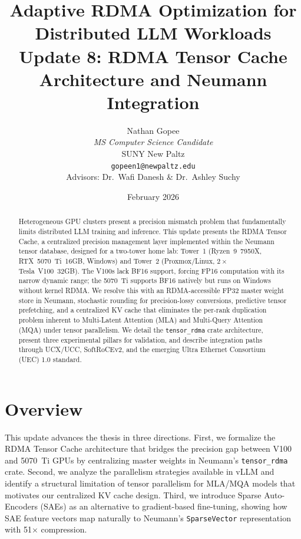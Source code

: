 \documentclass[11pt,letterpaper]{article}
\title{
    \vspace{-1cm}
    \textbf{Adaptive RDMA Optimization for Distributed LLM Workloads} \\[0.5em]
    \large Update 8: RDMA Tensor Cache Architecture and Neumann Integration
}
\author{
    Nathan Gopee \\
    \textit{MS Computer Science Candidate} \\
    SUNY New Paltz \\
    \texttt{gopeen1@newpaltz.edu} \\[1em]
    \small Advisors: Dr.\ Wafi Danesh \& Dr.\ Ashley Suchy
}
\date{February 2026}
\theoremstyle{definition}
\begin{document}
\maketitle

\begin{abstract}
\noindent
Heterogeneous GPU clusters present a precision mismatch problem that fundamentally limits distributed LLM training and inference. This update presents the RDMA Tensor Cache, a centralized precision management layer implemented within the Neumann tensor database, designed for a two-tower home lab: Tower~1 (Ryzen~9~7950X, RTX~5070~Ti~16GB, Windows) and Tower~2 (Proxmox/Linux, $2\times$ Tesla~V100~32GB). The V100s lack BF16 support, forcing FP16 computation with its narrow dynamic range; the 5070~Ti supports BF16 natively but runs on Windows without kernel RDMA. We resolve this with an RDMA-accessible FP32 master weight store in Neumann, stochastic rounding for precision-lossy conversions, predictive tensor prefetching, and a centralized KV cache that eliminates the per-rank duplication problem inherent to Multi-Latent Attention (MLA) and Multi-Query Attention (MQA) under tensor parallelism. We detail the \texttt{tensor\_rdma} crate architecture, present three experimental pillars for validation, and describe integration paths through UCX/UCC, SoftRoCEv2, and the emerging Ultra Ethernet Consortium (UEC) 1.0 standard.
\end{abstract}

\tableofcontents
\newpage

\section{Overview}
\label{sec:overview}

This update advances the thesis in three directions. First, we formalize the RDMA Tensor Cache architecture that bridges the precision gap between V100 and 5070~Ti GPUs by centralizing master weights in Neumann's \texttt{tensor\_rdma} crate. Second, we analyze the parallelism strategies available in vLLM and identify a structural limitation of tensor parallelism for MLA/MQA models that motivates our centralized KV cache design. Third, we introduce Sparse Auto-Encoders (SAEs) as an alternative to gradient-based fine-tuning, showing how SAE feature vectors map naturally to Neumann's \texttt{SparseVector} representation with 51$\times$ compression.
\end{document}
